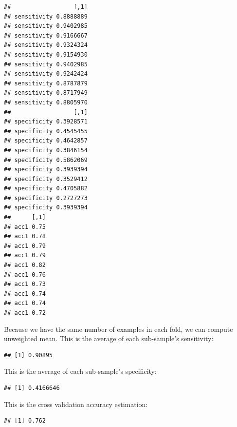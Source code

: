 \documentclass{article}\usepackage[]{graphicx}\usepackage[]{color}
\makeatletter
\newenvironment{kframe}{%
 \def\at@end@of@kframe{}%
 \ifinner\ifhmode%
  \def\at@end@of@kframe{\end{minipage}}%
  \begin{minipage}{\columnwidth}%
 \fi\fi%
 \def\FrameCommand##1{\hskip\@totalleftmargin \hskip-\fboxsep
 \colorbox{shadecolor}{##1}\hskip-\fboxsep
     \hskip-\linewidth \hskip-\@totalleftmargin \hskip\columnwidth}%
 \MakeFramed {\advance\hsize-\width
   \@totalleftmargin\z@ \linewidth\hsize
   \@setminipage}}%
 {\par\unskip\endMakeFramed%
 \at@end@of@kframe}
\newenvironment{knitrout}{}{} %
\makeatother
\begin{document}
\begin{knitrout}
\color{fgcolor}\begin{kframe}
\begin{verbatim}
##                  [,1]
## sensitivity 0.8888889
## sensitivity 0.9402985
## sensitivity 0.9166667
## sensitivity 0.9324324
## sensitivity 0.9154930
## sensitivity 0.9402985
## sensitivity 0.9242424
## sensitivity 0.8787879
## sensitivity 0.8717949
## sensitivity 0.8805970
##                  [,1]
## specificity 0.3928571
## specificity 0.4545455
## specificity 0.4642857
## specificity 0.3846154
## specificity 0.5862069
## specificity 0.3939394
## specificity 0.3529412
## specificity 0.4705882
## specificity 0.2727273
## specificity 0.3939394
##      [,1]
## acc1 0.75
## acc1 0.78
## acc1 0.79
## acc1 0.79
## acc1 0.82
## acc1 0.76
## acc1 0.73
## acc1 0.74
## acc1 0.74
## acc1 0.72
\end{verbatim}
\end{kframe}
\end{knitrout}
Because we have the same number of examples in each fold, we can compute unweighted mean. This is the average of each sub-sample's sensitivity:
\begin{knitrout}
\color{fgcolor}\begin{kframe}
\begin{verbatim}
## [1] 0.90895
\end{verbatim}
\end{kframe}
\end{knitrout}
This is the average of each sub-sample's specificity:
\begin{knitrout}
\color{fgcolor}\begin{kframe}
\begin{verbatim}
## [1] 0.4166646
\end{verbatim}
\end{kframe}
\end{knitrout}
This is the cross validation accuracy estimation:
\begin{knitrout}
\color{fgcolor}\begin{kframe}
\begin{verbatim}
## [1] 0.762
\end{verbatim}
\end{kframe}
\end{knitrout}
\end{document}
